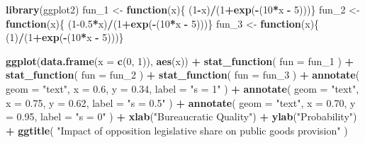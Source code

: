 \documentclass[12pt,]{book}
\newenvironment{Shaded}{\begin{snugshade}}{\end{snugshade}}
\newcommand{\ControlFlowTok}[1]{\textcolor[rgb]{0.13,0.29,0.53}{\textbf{#1}}}
\newcommand{\DataTypeTok}[1]{\textcolor[rgb]{0.13,0.29,0.53}{#1}}
\newcommand{\DecValTok}[1]{\textcolor[rgb]{0.00,0.00,0.81}{#1}}
\newcommand{\FloatTok}[1]{\textcolor[rgb]{0.00,0.00,0.81}{#1}}
\newcommand{\KeywordTok}[1]{\textcolor[rgb]{0.13,0.29,0.53}{\textbf{#1}}}
\newcommand{\NormalTok}[1]{#1}
\newcommand{\OperatorTok}[1]{\textcolor[rgb]{0.81,0.36,0.00}{\textbf{#1}}}
\newcommand{\StringTok}[1]{\textcolor[rgb]{0.31,0.60,0.02}{#1}}
\begin{document}
\begin{Shaded}
\begin{Highlighting}[]
\KeywordTok{library}\NormalTok{(ggplot2)}
\NormalTok{fun_}\DecValTok{1}\NormalTok{ <-}\StringTok{ }\ControlFlowTok{function}\NormalTok{(x)\{ (}\DecValTok{1}\OperatorTok{-}\NormalTok{x)}\OperatorTok{/}\NormalTok{(}\DecValTok{1}\OperatorTok{+}\KeywordTok{exp}\NormalTok{(}\OperatorTok{-}\NormalTok{(}\DecValTok{10}\OperatorTok{*}\NormalTok{x }\OperatorTok{-}\StringTok{ }\DecValTok{5}\NormalTok{)))\}}
\NormalTok{fun_}\DecValTok{2}\NormalTok{ <-}\StringTok{ }\ControlFlowTok{function}\NormalTok{(x)\{ (}\DecValTok{1}\FloatTok{-0.5}\OperatorTok{*}\NormalTok{x)}\OperatorTok{/}\NormalTok{(}\DecValTok{1}\OperatorTok{+}\KeywordTok{exp}\NormalTok{(}\OperatorTok{-}\NormalTok{(}\DecValTok{10}\OperatorTok{*}\NormalTok{x }\OperatorTok{-}\StringTok{ }\DecValTok{5}\NormalTok{)))\}}
\NormalTok{fun_}\DecValTok{3}\NormalTok{ <-}\StringTok{ }\ControlFlowTok{function}\NormalTok{(x)\{ (}\DecValTok{1}\NormalTok{)}\OperatorTok{/}\NormalTok{(}\DecValTok{1}\OperatorTok{+}\KeywordTok{exp}\NormalTok{(}\OperatorTok{-}\NormalTok{(}\DecValTok{10}\OperatorTok{*}\NormalTok{x }\OperatorTok{-}\StringTok{ }\DecValTok{5}\NormalTok{)))\}}

\KeywordTok{ggplot}\NormalTok{(}\KeywordTok{data.frame}\NormalTok{(}\DataTypeTok{x =} \KeywordTok{c}\NormalTok{(}\DecValTok{0}\NormalTok{, }\DecValTok{1}\NormalTok{)), }\KeywordTok{aes}\NormalTok{(x)) }\OperatorTok{+}
\StringTok{  }\KeywordTok{stat_function}\NormalTok{(}
    \DataTypeTok{fun =}\NormalTok{ fun_}\DecValTok{1}
\NormalTok{  ) }\OperatorTok{+}
\StringTok{  }\KeywordTok{stat_function}\NormalTok{(}
    \DataTypeTok{fun =}\NormalTok{ fun_}\DecValTok{2}
\NormalTok{  ) }\OperatorTok{+}
\StringTok{  }\KeywordTok{stat_function}\NormalTok{(}
    \DataTypeTok{fun =}\NormalTok{ fun_}\DecValTok{3}
\NormalTok{  ) }\OperatorTok{+}
\StringTok{  }\KeywordTok{annotate}\NormalTok{(}
    \DataTypeTok{geom =} \StringTok{"text"}\NormalTok{,}
    \DataTypeTok{x =} \FloatTok{0.6}\NormalTok{,}
    \DataTypeTok{y =} \FloatTok{0.34}\NormalTok{,}
    \DataTypeTok{label =} \StringTok{"s = 1"}
\NormalTok{  ) }\OperatorTok{+}
\StringTok{  }\KeywordTok{annotate}\NormalTok{(}
    \DataTypeTok{geom =} \StringTok{"text"}\NormalTok{,}
    \DataTypeTok{x =} \FloatTok{0.75}\NormalTok{,}
    \DataTypeTok{y =} \FloatTok{0.62}\NormalTok{,}
    \DataTypeTok{label =} \StringTok{"s = 0.5"}
\NormalTok{  ) }\OperatorTok{+}
\StringTok{  }\KeywordTok{annotate}\NormalTok{(}
    \DataTypeTok{geom =} \StringTok{"text"}\NormalTok{,}
    \DataTypeTok{x =} \FloatTok{0.70}\NormalTok{,}
    \DataTypeTok{y =} \FloatTok{0.95}\NormalTok{,}
    \DataTypeTok{label =} \StringTok{"s = 0"}
\NormalTok{  ) }\OperatorTok{+}
\StringTok{  }\KeywordTok{xlab}\NormalTok{(}\StringTok{"Bureaucratic Quality"}\NormalTok{) }\OperatorTok{+}
\StringTok{  }\KeywordTok{ylab}\NormalTok{(}\StringTok{"Probability"}\NormalTok{) }\OperatorTok{+}
\StringTok{  }\KeywordTok{ggtitle}\NormalTok{(}
    \StringTok{"Impact of opposition legislative share on public goods provision"}
\NormalTok{  )}
\end{Highlighting}
\end{Shaded}
\end{document}
